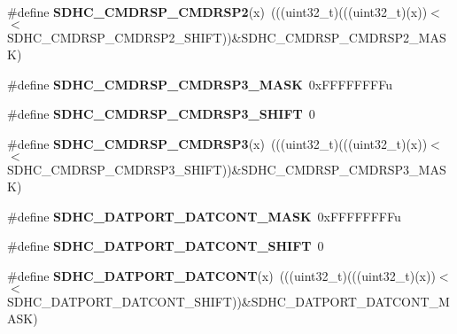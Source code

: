 \begin{DoxyCompactItemize}
\item 
\#define {\bfseries S\+D\+H\+C\+\_\+\+C\+M\+D\+R\+S\+P\+\_\+\+C\+M\+D\+R\+S\+P2}(x)~(((uint32\+\_\+t)(((uint32\+\_\+t)(x))$<$$<$S\+D\+H\+C\+\_\+\+C\+M\+D\+R\+S\+P\+\_\+\+C\+M\+D\+R\+S\+P2\+\_\+\+S\+H\+I\+FT))\&S\+D\+H\+C\+\_\+\+C\+M\+D\+R\+S\+P\+\_\+\+C\+M\+D\+R\+S\+P2\+\_\+\+M\+A\+SK)\hypertarget{group__SDHC__Register__Masks_ga6cd881a6a37704b8eb197856111608b6}{}\label{group__SDHC__Register__Masks_ga6cd881a6a37704b8eb197856111608b6}

\item 
\#define {\bfseries S\+D\+H\+C\+\_\+\+C\+M\+D\+R\+S\+P\+\_\+\+C\+M\+D\+R\+S\+P3\+\_\+\+M\+A\+SK}~0x\+F\+F\+F\+F\+F\+F\+F\+Fu\hypertarget{group__SDHC__Register__Masks_ga455887881ffdaa8edd983e6e68ffe4d2}{}\label{group__SDHC__Register__Masks_ga455887881ffdaa8edd983e6e68ffe4d2}

\item 
\#define {\bfseries S\+D\+H\+C\+\_\+\+C\+M\+D\+R\+S\+P\+\_\+\+C\+M\+D\+R\+S\+P3\+\_\+\+S\+H\+I\+FT}~0\hypertarget{group__SDHC__Register__Masks_ga5b08d155eccc29ab8f8ff62bc10a23a1}{}\label{group__SDHC__Register__Masks_ga5b08d155eccc29ab8f8ff62bc10a23a1}

\item 
\#define {\bfseries S\+D\+H\+C\+\_\+\+C\+M\+D\+R\+S\+P\+\_\+\+C\+M\+D\+R\+S\+P3}(x)~(((uint32\+\_\+t)(((uint32\+\_\+t)(x))$<$$<$S\+D\+H\+C\+\_\+\+C\+M\+D\+R\+S\+P\+\_\+\+C\+M\+D\+R\+S\+P3\+\_\+\+S\+H\+I\+FT))\&S\+D\+H\+C\+\_\+\+C\+M\+D\+R\+S\+P\+\_\+\+C\+M\+D\+R\+S\+P3\+\_\+\+M\+A\+SK)\hypertarget{group__SDHC__Register__Masks_ga025b72392ed5a288a1cd4482e6d66c8d}{}\label{group__SDHC__Register__Masks_ga025b72392ed5a288a1cd4482e6d66c8d}

\item 
\#define {\bfseries S\+D\+H\+C\+\_\+\+D\+A\+T\+P\+O\+R\+T\+\_\+\+D\+A\+T\+C\+O\+N\+T\+\_\+\+M\+A\+SK}~0x\+F\+F\+F\+F\+F\+F\+F\+Fu\hypertarget{group__SDHC__Register__Masks_gad3095c85c287cb31fd4cd815f8516213}{}\label{group__SDHC__Register__Masks_gad3095c85c287cb31fd4cd815f8516213}

\item 
\#define {\bfseries S\+D\+H\+C\+\_\+\+D\+A\+T\+P\+O\+R\+T\+\_\+\+D\+A\+T\+C\+O\+N\+T\+\_\+\+S\+H\+I\+FT}~0\hypertarget{group__SDHC__Register__Masks_ga8d1d79a58015eaa7fe8f8dc6f3655781}{}\label{group__SDHC__Register__Masks_ga8d1d79a58015eaa7fe8f8dc6f3655781}

\item 
\#define {\bfseries S\+D\+H\+C\+\_\+\+D\+A\+T\+P\+O\+R\+T\+\_\+\+D\+A\+T\+C\+O\+NT}(x)~(((uint32\+\_\+t)(((uint32\+\_\+t)(x))$<$$<$S\+D\+H\+C\+\_\+\+D\+A\+T\+P\+O\+R\+T\+\_\+\+D\+A\+T\+C\+O\+N\+T\+\_\+\+S\+H\+I\+FT))\&S\+D\+H\+C\+\_\+\+D\+A\+T\+P\+O\+R\+T\+\_\+\+D\+A\+T\+C\+O\+N\+T\+\_\+\+M\+A\+SK)\hypertarget{group__SDHC__Register__Masks_gaa6e82dc6e7cf2202094a103b0006ba05}{}\label{group__SDHC__Register__Masks_gaa6e82dc6e7cf2202094a103b0006ba05}


\end{DoxyCompactItemize}
